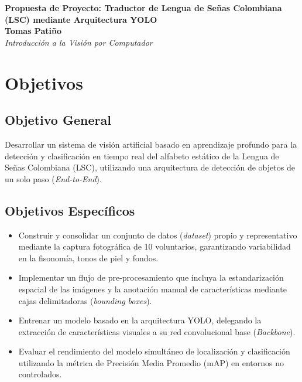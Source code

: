 \documentclass[12pt,letterpaper]{article}
\begin{document}
\begin{center}
    \vspace*{1cm}
    \Large \textbf{Propuesta de Proyecto: Traductor de Lengua de Señas Colombiana (LSC) mediante Arquitectura YOLO} \\
    \vspace{0.5cm}
    \normalsize \textbf{Tomas Patiño} \\
    \vspace{0.2cm}
    \textit{Introducción a la Visión por Computador} \\
    \vspace{1cm}
\end{center}

\section{Objetivos}

\subsection{Objetivo General}
Desarrollar un sistema de visión artificial basado en aprendizaje profundo para la detección y clasificación en tiempo real del alfabeto estático de la Lengua de Señas Colombiana (LSC), utilizando una arquitectura de detección de objetos de un solo paso (\textit{End-to-End}).

\subsection{Objetivos Específicos}
\begin{itemize}[leftmargin=*]
    \item Construir y consolidar un conjunto de datos (\textit{dataset}) propio y representativo mediante la captura fotográfica de 10 voluntarios, garantizando variabilidad en la fisonomía, tonos de piel y fondos.
    \item Implementar un flujo de pre-procesamiento que incluya la estandarización espacial de las imágenes y la anotación manual de características mediante cajas delimitadoras (\textit{bounding boxes}).
    \item Entrenar un modelo basado en la arquitectura YOLO, delegando la extracción de características visuales a su red convolucional base (\textit{Backbone}).
    \item Evaluar el rendimiento del modelo simultáneo de localización y clasificación utilizando la métrica de Precisión Media Promedio (mAP) en entornos no controlados.
\end{itemize}
\end{document}
